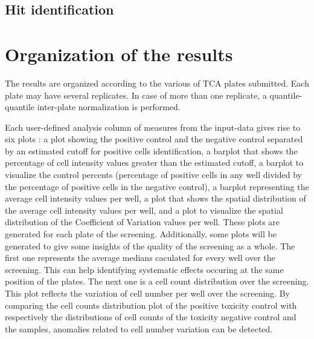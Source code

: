\documentclass[a4paper,10pt]{article}
\begin{document}
\bigskip



\subsection*{Hit identification}

\section*{Organization of the results}
The results are organized according to the various of TCA plates submitted. Each plate may have
several replicates. In case of more than one replicate, a quantile-quantile inter-plate normalization
is performed.

 
Each user-defined analysis column of measures from the input-data gives rise to six plots : a plot showing
the positive control and the negative control separated by an estimated cutoff for positive cells identification, a barplot 
that shows the percentage of cell intensity values greater than the estimated cutoff, a barplot 
to visualize the control percents (percentage of positive cells in any well divided by the percentage
of positive cells in the negative control), a barplot representing the average cell intensity values per well, a plot that shows the 
spatial distribution of the average cell intensity values per well, and a plot to visualize the spatial distribution 
of the Coefficient of Variation values per well. These plots are generated for each plate of the screening. Additionally,
some plots will be generated to give some insights of the quality of the screening as a whole. The first one represents the average medians
caculated for every well over the screening. This can help identifying
systematic effects occuring at the same position of the plates. The next one is a cell count distribution
over the screening. This plot reflects the variation of cell number per well over the screening. By comparing 
the cell counts distribution plot of the positive toxicity control with respectively the distributions of cell counts of 
the toxicity negative control and the samples, anomalies related to cell number variation can be detected.
\end{document}
